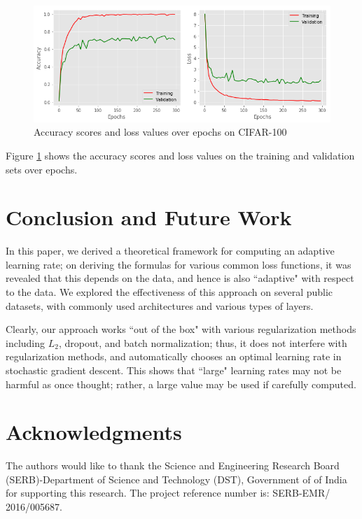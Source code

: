 \documentclass{article}
\begin{document}
\begin{figure}
    \centering
    \includegraphics[scale=0.4]{plot-rn162.png}
    \caption{Accuracy scores and loss values over epochs on CIFAR-100}
    \label{fig:cifar100:2}
\end{figure}

Figure \ref{fig:cifar100:2} shows the accuracy scores and loss values on the training and validation sets over epochs.

\section{Conclusion and Future Work}
In this paper, we derived a theoretical framework for computing an adaptive learning rate; on deriving the formulas for various common loss functions, it was revealed that this depends on the data, and hence is also ``adaptive" with respect to the data. We explored the effectiveness of this approach on several public datasets, with commonly used architectures and various types of layers.

Clearly, our approach works ``out of the box" with various regularization methods including $L_2$, dropout, and batch normalization; thus, it does not interfere with regularization methods, and automatically chooses an optimal learning rate in stochastic gradient descent. This shows that ``large" learning rates may not be harmful as once thought; rather, a large value may be used if carefully computed.


\section*{Acknowledgments}
The authors would like to thank the Science and Engineering Research
Board (SERB)-Department of Science and Technology
(DST), Government of of India for supporting this research.
The project reference number is: SERB-EMR/ 2016/005687.
\vskip 0.2in



\end{document}

